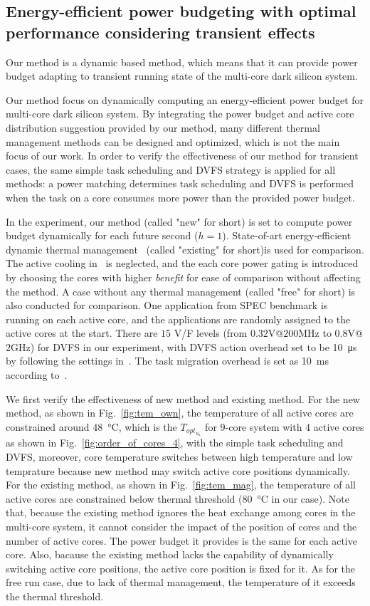 \subsection{Energy-efficient power budgeting with optimal performance considering transient effects}
Our method is a dynamic based method, which means that it can provide power budget adapting to transient running state of the multi-core dark silicon system.

Our method focus on dynamically computing an energy-efficient power budget for multi-core dark silicon system. By integrating the power budget and active core distribution suggestion provided by our method, many different thermal management methods can be designed and optimized, which is not the main focus of our work. In order to verify the effectiveness of our method for transient cases, the same simple task scheduling and DVFS strategy is applied for all methods: a power matching determines task scheduling and DVFS is performed when the task on a core consumes more power than the provided power budget.

In the experiment, our method (called "new" for short) is set to compute power budget dynamically for each future second ($h=1$). State-of-art energy-efficient dynamic thermal management~\cite{Hanumaiah:TCOMP'14} (called "existing" for short)is used for comparison. The active cooling in~\cite{Hanumaiah:TCOMP'14} is neglected, and the each core power gating is introduced by choosing the cores with higher \emph{benefit} for ease of comparison without affecting the method. A case without any thermal management (called "free" for short) is also conducted for comparison. One application from SPEC benchmark is running on each active core, and the applications are randomly assigned to the active cores at the start. There are $15$ V/F levels (from $0.32$V@$200$MHz to $0.8$V@$2$GHz) for DVFS in our experiment, with DVFS action overhead set to be \SI{10}{\us} by following the settings in~\cite{Lu:MICRO'05}. The task migration overhead is set as \SI{10}{\ms} according to~\cite{Cuesta:ISVLSI'10}.

We first verify the effectiveness of new method and existing method. For the new method, as shown in Fig.~\ref{fig:tem_own}, the temperature of all active cores are constrained around \SI{48}{\degreeCelsius}, which is the $T_{opt_{n_{a}}}$ for $9$-core system with $4$ active cores as shown in Fig.~\ref{fig:order_of_cores_4}, with the simple task scheduling and DVFS, moreover, core temperature switches between high temperature and low temprature because new method may switch active core positions dynamically. For the existing method, as shown in Fig.~\ref{fig:tem_mag}, the temperature of all active cores are constrained below thermal threshold (\SI{80}{\degreeCelsius} in our case). Note that, because the existing method ignores the heat exchange among cores in the multi-core system, it cannot consider the impact of the position of cores and 
the number of active cores. The power budget it provides is the same for each active core. Also, bacause the existing method lacks the capability of dynamically switching active core positions, the active core position is fixed for it. As for the free run case, due to lack of thermal management, the temperature of it exceeds the thermal threshold.

